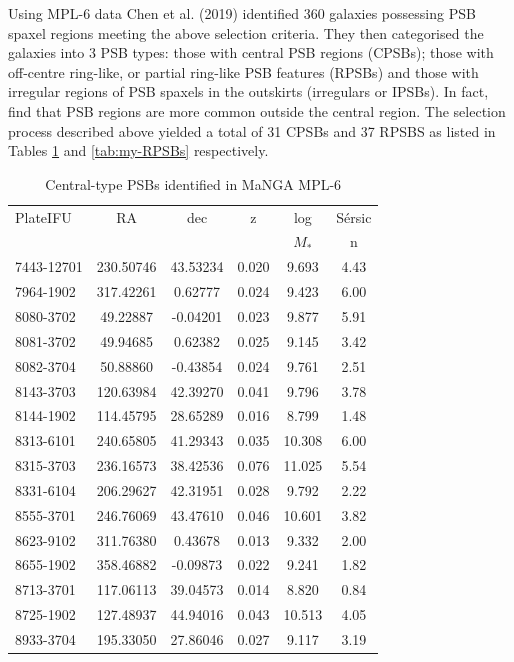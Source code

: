 Using MPL-6 data Chen et al. (2019) identified 360 galaxies possessing PSB spaxel regions meeting the above selection criteria. They then categorised the galaxies into 3 PSB types: those with central PSB regions (CPSBs); those with off-centre ring-like, or partial ring-like PSB features (RPSBs) and those with irregular regions of  PSB spaxels in the outskirts (irregulars or IPSBs). In fact, \citet{2018MNRAS.480.2544R} find that PSB regions are more common outside the central region. The selection process described above yielded a total of 31 CPSBs and 37 RPSBS as listed in Tables \ref{tab:my-CPSBs} and \ref{tab:my-RPSBs} respectively.

\begin{table}[h]
\caption{Central-type PSBs identified in MaNGA MPL-6}
\label{tab:my-CPSBs}
\begin{tabular}{lccccc}
\hline
PlateIFU & RA & dec & z & log & S\'ersic\\
& & & & $M_*$ & n \\
\hline
7443-12701 & 230.50746 & 43.53234 & 0.020 & 9.693 & 4.43 \\
7964-1902 & 317.42261 & 0.62777 & 0.024 & 9.423 & 6.00 \\
8080-3702 & 49.22887 & -0.04201 & 0.023 & 9.877 & 5.91 \\
8081-3702 & 49.94685 & 0.62382 & 0.025 & 9.145 & 3.42 \\
8082-3704 & 50.88860 & -0.43854 & 0.024 & 9.761 & 2.51 \\
8143-3703 & 120.63984 & 42.39270 & 0.041 & 9.796 & 3.78 \\
8144-1902 & 114.45795 & 28.65289 & 0.016 & 8.799 & 1.48 \\
8313-6101 & 240.65805 & 41.29343 & 0.035 & 10.308 & 6.00 \\
8315-3703 & 236.16573 & 38.42536 & 0.076 & 11.025 & 5.54 \\
8331-6104 & 206.29627 & 42.31951 & 0.028 & 9.792 & 2.22 \\
8555-3701 & 246.76069 & 43.47610 & 0.046 & 10.601 & 3.82 \\
8623-9102 & 311.76380 & 0.43678 & 0.013 & 9.332 & 2.00 \\
8655-1902 & 358.46882 & -0.09873 & 0.022 & 9.241 & 1.82 \\
8713-3701 & 117.06113 & 39.04573 & 0.014 & 8.820 & 0.84 \\
8725-1902 & 127.48937 & 44.94016 & 0.043 & 10.513 & 4.05 \\
8933-3704 & 195.33050 & 27.86046 & 0.027 & 9.117 & 3.19 \\

\end{tabular}
\end{table}
